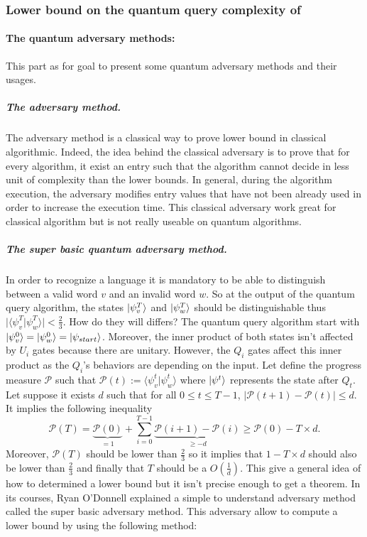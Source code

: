 \subsubsection{Lower bound on the quantum query complexity of }

\paragraph*{\textbf{The quantum adversary methods:}}
This part as for goal to present some quantum adversary methods and their usages.

\subparagraph*{\textbf{The adversary method.}} The adversary method is a classical
way to prove lower bound in classical algorithmic. Indeed, the idea behind the classical
adversary is to prove that for every algorithm, it exist an entry such that the algorithm
cannot decide in less unit of complexity than the lower bounds. In general, during
the algorithm execution, the adversary modifies entry values that have not been already used
in order to increase the execution time. This classical adversary work great for classical
algorithm but is not really useable on  quantum algorithms.

\subparagraph*{\textbf{The super basic quantum adversary method.}}
In order to recognize a language it is mandatory to be able to distinguish between
a valid word $v$ and an invalid word $w$. So at the output of the quantum query
algorithm, the states $|\psi^T_v\rangle$ and $|\psi^T_w\rangle$ should be distinguishable thus
$\vert \langle \psi_v^T \vert \psi_w^T \rangle \vert < \frac{2}{3}$. How do they
will differs? The quantum query algorithm start with
$|\psi^0_v\rangle = |\psi^0_w\rangle = |\psi_{start}\rangle$. Moreover, the inner product
of both states isn't affected by $U_i$ gates because there are unitary. However, the $Q_i$
gates affect this inner product as the $Q_i$'s behaviors are depending on the input.
Let define the progress measure $\mathcal{P}$ such that
$\mathcal{P}(t) := \langle \psi_v^t \vert \psi_w^t \rangle$ where $|\psi^t\rangle$ represents
the state after $Q_t$. Let suppose it exists $d$ such that for all $0\leq t \leq T-1$,
$\vert \mathcal{P}(t+1)-\mathcal{P}(t)\vert \leq d$. It implies the following inequality
\[
    \mathcal{P}(T) = \underbrace{\mathcal{P}(0)}_{=1} + \sum_{i=0}^{T-1}\underbrace{\mathcal{P}(i+1)-\mathcal{P}(i)}_{\geq -d}  \geq \mathcal{P}(0) - T\times d.
\]
Moreover, $\mathcal{P}(T)$ should be lower than $\frac{2}{3}$ so it implies that
$1 - T\times d$ should also be lower than $\frac{2}{3}$ and finally that
$T$ should be a $O(\frac{1}{d})$. This give a general idea of how to determined
a lower bound but it isn't precise enough to get a theorem. In its courses,
Ryan O'Donnell \cite{Odonnel_course} explained a simple to understand adversary method called the super
basic adversary method. This adversary allow to compute a lower bound
by using the following method:

